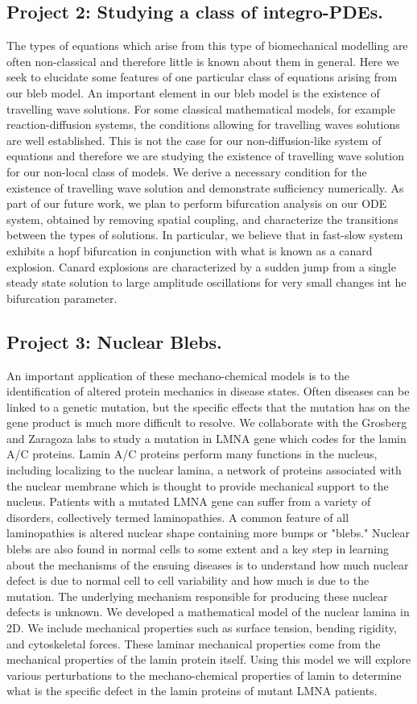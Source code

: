 \subsection*{Project 2: Studying a class of integro-PDEs.}
The types of equations which arise from this type of biomechanical modelling are often non-classical and therefore little is known about them in general. Here we seek to elucidate some features of one particular class of equations arising from our bleb model. An important element in our bleb model is the existence of travelling wave solutions. For some classical mathematical models, for example reaction-diffusion systems, the conditions allowing for travelling waves solutions are well established. This is not the case for our  non-diffusion-like system of equations and therefore we are studying the existence of travelling wave solution for our non-local class of models. We derive a necessary condition for the existence of travelling wave solution and demonstrate sufficiency numerically. As part of our future work, we plan to perform bifurcation analysis on our ODE system, obtained by removing spatial coupling, and characterize the transitions between the types of solutions. In particular, we believe that in fast-slow system exhibits a hopf bifurcation in conjunction with what is known as a canard explosion. Canard explosions are characterized by a sudden jump from a single steady state solution to large amplitude oscillations for very small changes int he bifurcation parameter. 

\subsection*{Project 3: Nuclear Blebs.}
An important application of these mechano-chemical models is to the identification of altered protein mechanics in disease states. Often diseases can be linked to a genetic mutation, but the specific effects that the mutation has on the gene product is much more difficult to resolve. We collaborate with the Grosberg and Zaragoza labs to study a mutation in LMNA gene which codes for the lamin A/C proteins. Lamin A/C proteins perform many functions in the nucleus, including localizing to the nuclear lamina, a network of proteins associated with the nuclear membrane which is thought to provide mechanical support to the nucleus. Patients with a mutated LMNA gene can suffer from a variety of disorders, collectively termed laminopathies. A common feature of all laminopathies is altered nuclear shape containing more bumps or "blebs." Nuclear blebs are also found in normal cells to some extent and a key step in learning about the mechanisms of the ensuing diseases is to understand how much nuclear defect is due to normal cell to cell variability and how much is due to the mutation. The underlying mechanism responsible for producing these nuclear defects is unknown. We developed a mathematical model of the nuclear lamina in 2D. We include mechanical properties such as surface tension, bending rigidity, and cytoskeletal forces. These laminar mechanical properties come from the mechanical properties of the lamin protein itself. Using this model we will explore various perturbations to the mechano-chemical properties of lamin to determine what is the specific defect in the lamin proteins of mutant LMNA patients.
